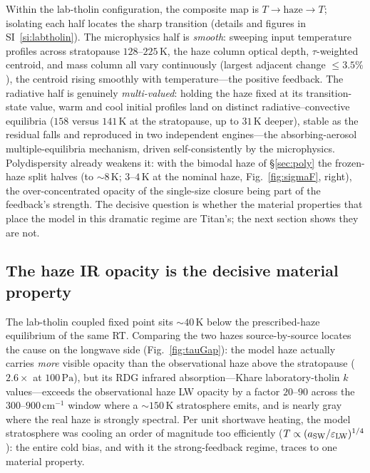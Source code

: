 \documentclass[11pt]{article}
\begin{document}
Within the lab-tholin configuration, the composite map is
$T\!\to\!\text{haze}\!\to\!T$; isolating each half locates the sharp transition
(details and figures in SI~\ref{si:labtholin}).  The microphysics half is
\emph{smooth}: sweeping input temperature profiles across stratopause
$128$--$225\,\mathrm{K}$, the haze column optical depth, $\tau$-weighted
centroid, and mass column all vary continuously (largest adjacent change
$\le3.5\%$), the centroid rising smoothly with temperature---the positive
feedback.  The radiative half is genuinely \emph{multi-valued}: holding the
haze fixed at its transition-state value, warm and cool initial profiles land
on distinct radiative--convective equilibria ($158$ versus $141\,\mathrm{K}$ at
the stratopause, up to $31\,\mathrm{K}$ deeper), stable as the residual falls
and reproduced in two independent engines---the absorbing-aerosol
multiple-equilibria mechanism, driven self-consistently by the microphysics.
Polydispersity already weakens it: with the bimodal haze of \S\ref{sec:poly}
the frozen-haze split halves (to $\sim\!8\,\mathrm{K}$; $3$--$4\,\mathrm{K}$ at
the nominal haze, Fig.~\ref{fig:sigmaF}, right), the over-concentrated opacity
of the single-size closure being part of the feedback's strength.  The decisive
question is whether the material properties that place the model in this
dramatic regime are Titan's; the next section shows they are not.

\subsection{The haze IR opacity is the decisive material property}
\label{sec:coupling-cont}

The lab-tholin coupled fixed point sits $\sim\!40\,\mathrm{K}$ below the
prescribed-haze equilibrium of the same RT.  Comparing the two hazes
source-by-source locates the cause on the longwave side
(Fig.~\ref{fig:tauGap}): the model
haze actually carries \emph{more} visible opacity than the observational haze
above the stratopause ($2.6\times$ at $100\,\mathrm{Pa}$), but its RDG infrared
absorption---Khare laboratory-tholin $k$ values---exceeds the observational haze
LW opacity by a factor $20$--$90$ across the $300$--$900\,\mathrm{cm^{-1}}$
window where a $\sim\!150\,\mathrm{K}$ stratosphere emits, and is nearly gray
where the real haze is strongly spectral.  Per unit shortwave heating, the model
stratosphere was cooling an order of magnitude too efficiently
($T\propto(a_{\rm SW}/\varepsilon_{\rm LW})^{1/4}$): the entire cold bias, and
with it the strong-feedback regime, traces to one material property.
\end{document}
